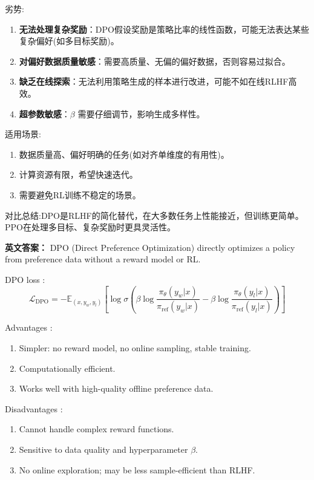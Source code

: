 \documentclass[10pt,a4paper]{ctexart}
\begin{document}
 劣势:
\begin{enumerate}
    \item \textbf{无法处理复杂奖励}：DPO假设奖励是策略比率的线性函数，可能无法表达某些复杂偏好(如多目标奖励)。
    \item \textbf{对偏好数据质量敏感}：需要高质量、无偏的偏好数据，否则容易过拟合。
    \item \textbf{缺乏在线探索}：无法利用策略生成的样本进行改进，可能不如在线RLHF高效。
    \item \textbf{超参数敏感}：\(\beta\) 需要仔细调节，影响生成多样性。
\end{enumerate}

 适用场景:
\begin{enumerate}
    \item 数据质量高、偏好明确的任务(如对齐单维度的有用性)。
    \item 计算资源有限，希望快速迭代。
    \item 需要避免RL训练不稳定的场景。
\end{enumerate}

 对比总结:DPO是RLHF的简化替代，在大多数任务上性能接近，但训练更简单。PPO在处理多目标、复杂奖励时更具灵活性。

\textbf{英文答案：}  
DPO (Direct Preference Optimization) directly optimizes a policy from preference data without a reward model or RL.

 DPO loss :
\[
\mathcal{L}_{\text{DPO}} = -\mathbb{E}_{(x, y_w, y_l)} \left[ \log \sigma \left( \beta \log \frac{\pi_\theta(y_w|x)}{\pi_{\text{ref}}(y_w|x)} - \beta \log \frac{\pi_\theta(y_l|x)}{\pi_{\text{ref}}(y_l|x)} \right) \right]
\]

 Advantages :
\begin{enumerate}
    \item Simpler: no reward model, no online sampling, stable training.
    \item Computationally efficient.
    \item Works well with high-quality offline preference data.
\end{enumerate}

 Disadvantages :
\begin{enumerate}
    \item Cannot handle complex reward functions.
    \item Sensitive to data quality and hyperparameter \(\beta\).
    \item No online exploration; may be less sample-efficient than RLHF.
\end{enumerate}
\end{document}
